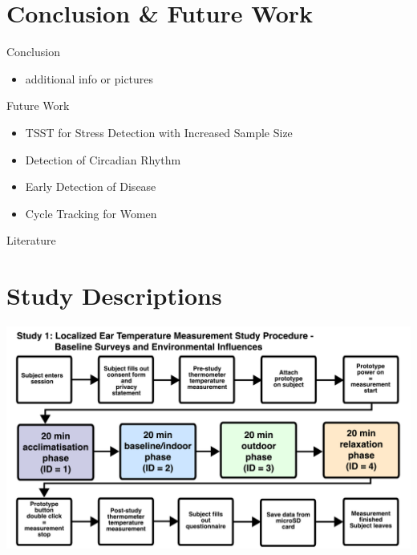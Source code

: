\documentclass[en]{sdqbeamer}
\begin{document}
\section{Conclusion \& Future Work}
\begin{frame}{Conclusion}
    \begin{itemize}
        \item additional info or pictures
    \end{itemize}
\end{frame}

\begin{frame}{Future Work}
    \begin{itemize}
        \item TSST for Stress Detection with Increased Sample Size
        \item Detection of Circadian Rhythm
        \item Early Detection of Disease
        \item Cycle Tracking for Women
    \end{itemize}
\end{frame}

\appendix
\beginbackup


\begin{frame}{Literature}
    \printbibliography
\end{frame}

\section{Study Descriptions}
\begin{frame}
    \begin{center}
        \includegraphics[width=0.9\linewidth]{../thesis-doc/images/study1/Procedure.pdf} %
    \end{center}
\end{frame}
\end{document}
